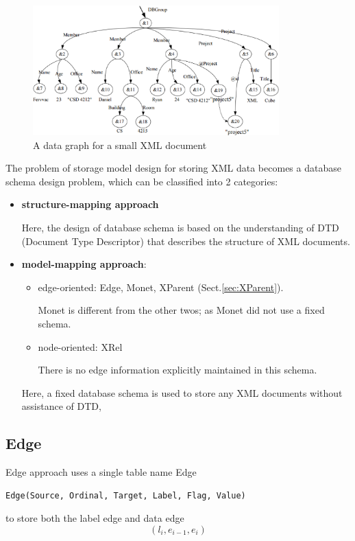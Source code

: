 \begin{figure}[hbt]
  \centerline{\includegraphics[height=5cm,
    angle=0]{./images/XML_graph.eps}}
\caption{A data graph for a small XML document}
\label{fig:XML_graph}
\end{figure}


The problem of storage model design for storing
XML data becomes a database schema design
problem, which can be classified into 2 categories:
\begin{itemize}
  \item {\bf structure-mapping approach} 
  
Here, the design of database schema is based on the understanding of DTD
(Document Type Descriptor) that describes the structure of XML documents.
  
  \item {\bf model-mapping approach}: 
  \begin{itemize}
    \item edge-oriented: Edge, Monet, XParent (Sect.\ref{sec:XParent}).
    
    Monet is different from the other twos; as Monet did not use a fixed schema.
    
    \item node-oriented: XRel
  
  There is no edge information explicitly maintained in this schema.
  \end{itemize}
  
Here, a fixed database schema is used to store any XML documents without
assistance of DTD,
\end{itemize}



\subsection{Edge}
\label{sec:Edge}

Edge approach uses a single table name Edge
\begin{verbatim}
Edge(Source, Ordinal, Target, Label, Flag, Value)
\end{verbatim}
to store both the label edge and data edge 
\begin{equation*}
(l_i, e_{i-1},e_i)
\end{equation*}


